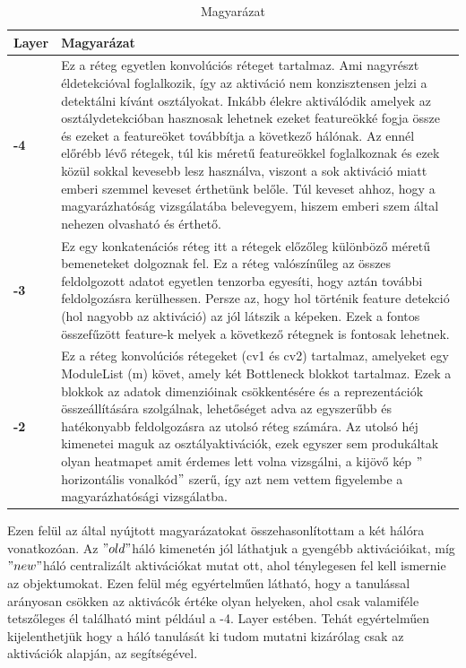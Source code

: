 \documentclass[12pt,oneside,a4paper]{article}
\theoremstyle{remark}
\newcommand{\oldh}{\( "old" \)}\label{makro2}
\newcommand{\newh}{\( "new" \)}
\begin{document}
\begin{table}[ht]
    \center
    \begin{tabularx}{\textwidth}{|p{}||X|}
        \hline
        \textbf{Layer} & Magyarázat     \\
        \hline
        \textbf{-4}    & Ez a réteg egyetlen konvolúciós réteget tartalmaz.
        Ami nagyrészt éldetekcióval foglalkozik, így az aktiváció nem konzisztensen jelzi a detektálni kívánt osztályokat.
        Inkább élekre aktiválódik amelyek az osztálydetekcióban hasznosak lehetnek ezeket \gls{feature}ökké fogja
        össze és ezeket a \gls{feature}öket továbbítja a következő hálónak.
        Az ennél előrébb lévő rétegek, túl kis méretű \gls{feature}ökkel foglalkoznak és ezek közül sokkal kevesebb lesz használva,
        viszont a sok aktiváció miatt emberi szemmel keveset érthetünk belőle.
        Túl keveset ahhoz, hogy a magyarázhatóság vizsgálatába belevegyem, hiszem emberi szem által nehezen olvasható és érthető.\\
        \hline
        \textbf{-3}    & Ez egy konkatenációs réteg itt a rétegek előzőleg különböző méretű bemeneteket dolgoznak fel.
        Ez a réteg valószínűleg az összes feldolgozott adatot egyetlen tenzorba egyesíti, hogy aztán további
        feldolgozásra kerülhessen.
        Persze az, hogy hol történik \gls{feature} detekció (hol nagyobb az aktiváció) az jól látszik a képeken.
        Ezek a fontos összefűzött \gls{feature}-k
        melyek a következő rétegnek is fontosak lehetnek.\\
        \hline
        \textbf{-2}    &  Ez a réteg konvolúciós rétegeket (cv1 és cv2) tartalmaz, amelyeket egy ModuleList (m) követ,
        amely két Bottleneck blokkot tartalmaz.
        Ezek a blokkok az adatok dimenzióinak csökkentésére és a reprezentációk összeállítására szolgálnak,
        lehetőséget adva az egyszerűbb és hatékonyabb feldolgozásra az utolsó réteg számára.
        Az utolsó héj kimenetei maguk az osztályaktivációk, ezek egyszer sem produkáltak olyan heatmapet amit
        érdemes lett volna vizsgálni, a kijövő kép \("\)horizontális vonalkód\("\) szerű, így azt nem vettem figyelembe a
        magyarázhatósági vizsgálatba.\\
        \hline
    \end{tabularx}
    \caption{Magyarázat}\label{tab:debrief}
\end{table}
Ezen felül az  által nyújtott magyarázatokat összehasonlítottam a két hálóra vonatkozóan.
Az \oldh háló kimenetén jól láthatjuk a gyengébb aktivációikat, míg \newh háló centralizált aktivációkat mutat ott, ahol
ténylegesen fel kell ismernie az objektumokat.
Ezen felül még egyértelműen látható, hogy a tanulással arányosan csökken az aktivácók értéke olyan helyeken, ahol csak valamiféle
tetszőleges él található mint például a -4. Layer estében.
Tehát egyértelműen kijelenthetjük hogy a háló tanulását ki tudom mutatni kizárólag csak az aktivációk alapján, az
 segítségével.
\end{document}
